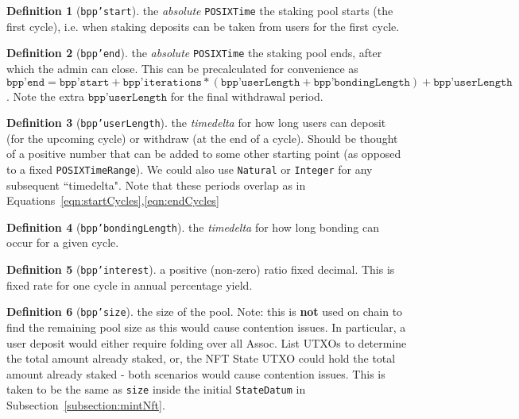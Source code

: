 \documentclass[10pt, a4paper]{article}
\theoremstyle{definition}
\newtheorem{definition}{Definition}[section]
\begin{document}
\begin{definition}[\texttt{bpp'start}]\label{def:bpp'start}
the \textit{absolute} \texttt{POSIXTime} the staking pool starts (the first cycle), i.e. when staking deposits can be taken from users for the first cycle.
\end{definition}

\begin{definition}[\texttt{bpp'end}]\label{def:bpp'end}
the \textit{absolute} \texttt{POSIXTime} the staking pool ends, after which the admin can close. This can be precalculated for convenience as $\texttt{bpp'end} = \texttt{bpp'start} +   \texttt{bpp'iterations} * (\texttt{bpp'userLength} + \texttt{bpp'bondingLength}) + \texttt{bpp'userLength}$. Note the extra $\texttt{bpp'userLength}$ for the final withdrawal period.
\end{definition}

\begin{definition}[\texttt{bpp'userLength}]\label{def:bpp'userLength}
the \textit{timedelta} for how long users can deposit (for the upcoming cycle) or withdraw (at the end of a cycle). Should be thought of a positive number that can be added to some other starting point (as opposed to a fixed \texttt{POSIXTimeRange}). We could also use \texttt{Natural} or \texttt{Integer} for any subsequent ``timedelta". Note that these periods overlap as in Equations~\ref{eqn:startCycles},\ref{eqn:endCycles}
\end{definition}

\begin{definition}[\texttt{bpp'bondingLength}]\label{def:bpp'depositWithdraw}
the \textit{timedelta} for how long bonding can occur for a given cycle.
\end{definition}

\begin{definition}[\texttt{bpp'interest}]\label{def:bpp'interest}
a positive (non-zero) ratio fixed decimal. This is fixed rate for one cycle in annual percentage yield.
\end{definition}

\begin{definition}[\texttt{bpp'size}]\label{def:bpp'size}
the size of the pool. Note: this is \textbf{not} used on chain to find the remaining pool size as this would cause contention issues. In particular, a user deposit would either require folding over all Assoc. List UTXOs to determine the total amount already staked, or, the NFT State UTXO could hold the total amount already staked - both scenarios would cause contention issues. This is taken to be the same as \texttt{size} inside the initial \texttt{StateDatum} in Subsection~\ref{subsection:mintNft}.
\end{definition}
\end{document}
